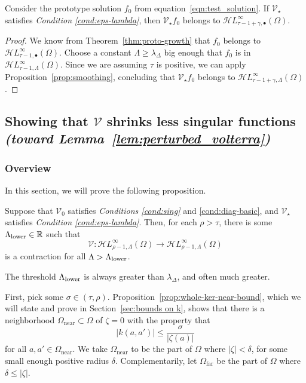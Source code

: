\documentclass[review]{siamart220329}
\newcommand{\R}{\mathbb{R}}
\newcommand{\singexp}[2]{\mathcal{H}L^\infty_{#1, #2}}
\newcommand{\singexpalg}[1]{\singexp{#1}{\bullet}}
\newcommand{\volterra}{\mathcal{V}}
\newcommand{\hardpart}{\mathcal{V}_0}
\newcommand{\softpart}{\mathcal{V}_\star}
\newcommand{\solproto}{f_0}
\newcommand{\domain}{\Omega}
\newcommand{\near}{\Omega_\text{near}}
\newcommand{\far}{\Omega_\text{far}}
\begin{document}
\begin{corollary}\label{cor:pertub_f0}
Consider the prototype solution $\solproto$ from equation~\eqref{eqn:test_solution}. If $\softpart$ satisfies {\em Condition \eqref{cond:eps-lambda}}, then $\softpart \solproto$ belongs to $\singexpalg{\tau-1+\gamma}(\domain)$.
\end{corollary}
\begin{proof}
We know from Theorem~\ref{thm:proto-growth} that $\solproto$ belongs to $\singexpalg{\tau-1}(\domain)$. Choose a constant $\Lambda \ge \lambda_\Delta$ big enough that $\solproto$ is in $\singexp{\tau-1}{\Lambda}(\domain)$. Since we are assuming $\tau$ is positive, we can apply Proposition~\ref{prop:smoothing}, concluding that $\softpart \solproto$ belongs to $\singexp{\tau-1+\gamma}{\Lambda}(\domain)$.
\end{proof}
\subsection{Showing that $\volterra$ shrinks less singular functions \\ \textit{(toward Lemma~\ref{lem:perturbed_volterra})}}\label{sec:V is a contraction}
\subsubsection{Overview}
In this section, we will prove the following proposition. %

\begin{proposition}\label{prop:get-contraction}
Suppose that $\hardpart$ satisfies {\em Conditions \eqref{cond:sing}} and \eqref{cond:diag-basic}, and $\softpart$ satisfies {\em Condition \eqref{cond:eps-lambda}}. Then, for each $\rho > \tau$, there is some $\Lambda_\text{\rm lower} \in \R$ such that
\[\volterra\colon\singexp{\rho-1}{\Lambda}(\domain)\to\singexp{\rho-1}{\Lambda}(\domain)\]
is a contraction for all $\Lambda > \Lambda_\text{\rm lower}$.
\end{proposition}
\begin{rmk}
The threshold $\Lambda_\text{\rm lower}$ is always greater than $\lambda_\Delta$, and often much greater.
\end{rmk}
First, pick some $\sigma \in (\tau, \rho)$. Proposition~\ref{prop:whole-ker-near-bound}, which we will state and prove in Section~\ref{sec:bounds on k}, shows that there is a neighborhood $\near \subset \domain$ of $\zeta = 0$ with the property that
\begin{equation}\label{near-limit}
|k(a, a')| \le \frac{\sigma}{|\zeta(a)|}
\end{equation}
for all $a, a' \in \near$. We take $\near$ to be the part of $\domain$ where $|\zeta| < \delta$, for some small enough positive radius $\delta$. Complementarily, let $\far$ be the part of $\domain$ where $\delta \le |\zeta|$.
\end{document}
